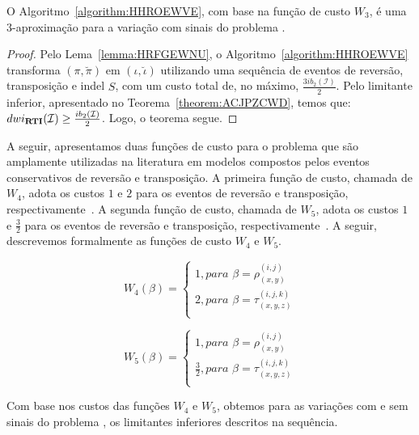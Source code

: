 \begin{theorem}\label{theorem:UMSMTVTN}
O Algoritmo~\ref{algorithm:HHROEWVE}, com base na função de custo $W_3$, é uma $3$-aproximação para a variação com sinais do problema \SbWIRTI{}.
\end{theorem}
\begin{proof}
Pelo Lema~\ref{lemma:HRFGEWNU}, o Algoritmo~\ref{algorithm:HHROEWVE} transforma $(\pi,\breve\pi)$ em $(\iota,\breve\iota)$ utilizando uma sequência de eventos de reversão, transposição e indel $S$, com um custo total de, no máximo, $\frac{3ib_2(\mathcal{I})}{2}$. Pelo limitante inferior, apresentado no Teorema~\ref{theorem:ACJPZCWD}, temos que: $dwi_{\textbf{RTI}}(\mathcal{I}) \ge \frac{ib_2(\mathcal{I})}{2}$. Logo, o teorema segue.
\end{proof}

A seguir, apresentamos duas funções de custo para o problema \SbWIRT{} que são amplamente utilizadas na literatura em modelos compostos pelos eventos conservativos de reversão e transposição. A primeira função de custo, chamada de $W_4$, adota os custos $1$ e $2$ para os eventos de reversão e transposição, respectivamente~\cite{2002-eriksen}. A segunda função de custo, chamada de $W_5$, adota os custos $1$ e $\frac{3}{2}$ para os eventos de reversão e transposição, respectivamente~\cite{2019a-oliveira-etal}. A seguir, descrevemos formalmente as funções de custo $W_4$ e $W_5$.

$$
  W_4(\beta) = \begin{cases}
      1, \textit{para } \beta = \rho_{(x,y)}^{(i,j)} \\
      2, \textit{para } \beta = \tau_{(x,y,z)}^{(i,j,k)} \\
  \end{cases}
$$ 

$$
  W_5(\beta) = \begin{cases}
      1, \textit{para } \beta = \rho_{(x,y)}^{(i,j)} \\
      \frac{3}{2}, \textit{para } \beta = \tau_{(x,y,z)}^{(i,j,k)} \\
  \end{cases}
$$

Com base nos custos das funções $W_4$ e $W_5$, obtemos para as variações com e sem sinais do problema \SbWIRT{}, os limitantes inferiores descritos na sequência.

